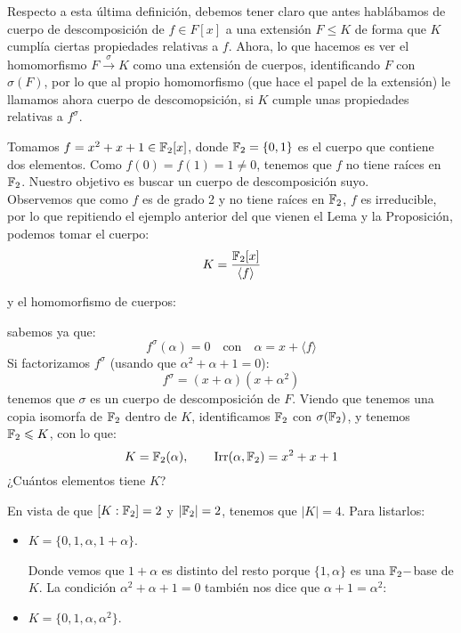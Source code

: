 \noindent
Respecto a esta última definición, debemos tener claro que antes hablábamos de cuerpo de descomposición de $f\in F[x]$ a una extensión $F\leq K$ de forma que $K$ cumplía ciertas propiedades relativas a $f$. Ahora, lo que hacemos es ver el homomorfismo $F\stackrel{\sigma}{\to} K$ como una extensión de cuerpos, identificando $F$ con $\sigma(F)$, por lo que al propio homomorfismo (que hace el papel de la extensión) le llamamos ahora cuerpo de descomopsición, si $K$ cumple unas propiedades relativas a $f^\sigma$.

\begin{ejemplo}
    Tomamos $f = x^2+x+1\in \mathbb{F}_2[x]$, donde $\mathbb{F}_2 = \{0,1\}$ es el cuerpo que contiene dos elementos. Como $f(0) = f(1) = 1 \neq 0$, tenemos que $f$ no tiene raíces en $\mathbb{F}_2$. Nuestro objetivo es buscar un cuerpo de descomposición suyo.\\

    \noindent
    Observemos que como $f$ es de grado 2 y no tiene raíces en $\mathbb{F}_2$, $f$ es irreducible, por lo que repitiendo el ejemplo anterior del que vienen el Lema y la Proposición, podemos tomar el cuerpo:
    \begin{equation*}
        K = \dfrac{\mathbb{F}_2[x]}{\langle f \rangle }
    \end{equation*}

    y el homomorfismo de cuerpos:

    sabemos ya que:
    \begin{equation*}
        f^\sigma(\alpha) = 0 \quad \text{con}\quad  \alpha = x+\langle f \rangle 
    \end{equation*}
    Si factorizamos $f^\sigma$ (usando que $\alpha^2 + \alpha+1=0$):
    \begin{equation*}
        f^\sigma = (x+\alpha)(x+\alpha^2)
    \end{equation*}
    tenemos que $\sigma$ es un cuerpo de descomposición de $F$. Viendo que tenemos una copia isomorfa de $\mathbb{F}_2$ dentro de $K$, identificamos $\mathbb{F}_2$ con $\sigma(\mathbb{F}_2)$, y tenemos $\mathbb{F}_2\leqslant K$, con lo que:
    \begin{equation*}
        K = \mathbb{F}_2(\alpha), \qquad \operatorname{Irr}(\alpha,\mathbb{F}_2) = x^2+x+1
    \end{equation*}
    ¿Cuántos elementos tiene $K$?

    \noindent
    En vista de que $[K:\mathbb{F}_2] = 2$ y $|\mathbb{F}_2| = 2$, tenemos que $|K| = 4$. Para listarlos:
    \begin{itemize}
        \item $K = \{0,1,\alpha,1+\alpha\}$. 

            Donde vemos que $1+\alpha$ es distinto del resto porque $\{1,\alpha\}$ es una $\mathbb{F}_2-$base de $K$. La condición $\alpha^2 + \alpha + 1 = 0$ también nos dice que $\alpha+1= \alpha^2$:
        \item $K = \{0,1,\alpha,\alpha^2\}$.
    \end{itemize}
\end{ejemplo}

